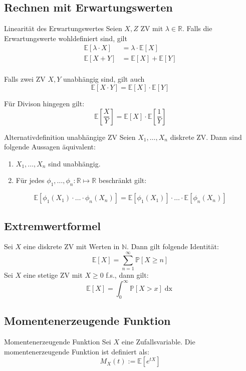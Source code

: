 \documentclass[a4paper,10pt]{article}
\def\R{\mathbb{R}}
\def\P{\mathbb{P}}
\def\E{\mathbb{E}}
\begin{document}
\subsection{Rechnen mit Erwartungswerten}
\begin{subbox}{Linearität des Erwartungswertes}
	Seien \(X,Z\) ZV mit \(\lambda \in \R\). Falls die Erwartungswerte wohldefiniert sind, gilt
	\begin{align*}
		\E[\lambda \cdot X] & = \lambda \cdot \E[X] \\
		\E[X + Y]           & = \E[X] + \E[Y]       \\
	\end{align*}
\end{subbox}
Falls zwei ZV \(X,Y\) unabhängig sind, gilt auch
\[\E[X\cdot Y] = \E[X] \cdot \E[Y]\]

Für Divison hingegen gilt:
\[\E[\frac{X}{Y}] = \E[X] \cdot \E[\frac{1}{Y}]\]

\begin{subbox}{Alternativdefinition unabhängige ZV}
	Seien \(X_1, \ldots, X_n\) diskrete ZV. Dann sind folgende Aussagen äquivalent:
	\begin{enumerate}
		\item \(X_1, \ldots, X_n\) sind unabhängig.
		\item Für jedes \(\phi_1, \ldots, \phi_n: \R \mapsto\R\) beschränkt gilt:
	\end{enumerate}
	\[\E[\phi_1(X_1)\cdot\ldots\cdot\phi_n(X_n)] = \E[\phi_1(X_1)] \cdot\ldots\cdot \E[\phi_n(X_n)]\]
\end{subbox}

\subsection{Extremwertformel}
Sei \(X\) eine diskrete ZV mit Werten in \(\mathbb{N}\). Dann gilt folgende Identität:
\[\E[X] = \sum_{n=1}^\infty \P[X\ge n]\]
Sei \(X\) eine stetige ZV mit \(X \ge 0\) f.s., dann gilt:
\[\E[X] = \int_0^\infty \P[X > x] \mathop{dx}\]

\subsection{Momentenerzeugende Funktion}

\begin{subbox}{Momentenerzeugende Funktion}
	Sei $X$ eine Zufallsvariable. Die momentenerzeugende Funktion ist definiert als:
	$$
		M_X(t) := \E \left[ e^{tX} \right]
	$$
\end{subbox}
\end{document}
